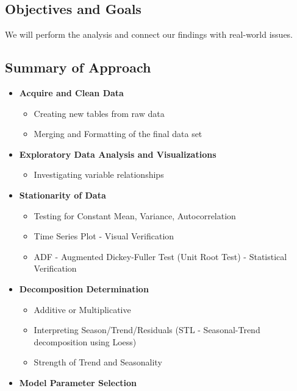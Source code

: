 \documentclass[
  letterpaper,
  DIV=11,
  numbers=noendperiod]{scrartcl}
\providecommand{\tightlist}{%
  \setlength{\itemsep}{0pt}\setlength{\parskip}{0pt}}\usepackage{longtable,booktabs,array}
\begin{document}
\subsection{Objectives and Goals}\label{objectives-and-goals}

We will perform the analysis and connect our findings with real-world
issues.

\subsection{Summary of Approach}\label{summary-of-approach}

\begin{itemize}
\tightlist
\item
  \textbf{Acquire and Clean Data}

  \begin{itemize}
  \tightlist
  \item
    Creating new tables from raw data
  \item
    Merging and Formatting of the final data set
  \end{itemize}
\item
  \textbf{Exploratory Data Analysis and Visualizations}

  \begin{itemize}
  \tightlist
  \item
    Investigating variable relationships
  \end{itemize}
\item
  \textbf{Stationarity of Data}

  \begin{itemize}
  \tightlist
  \item
    Testing for Constant Mean, Variance, Autocorrelation
  \item
    Time Series Plot - Visual Verification
  \item
    ADF - Augmented Dickey-Fuller Test (Unit Root Test) - Statistical
    Verification
  \end{itemize}
\item
  \textbf{Decomposition Determination}

  \begin{itemize}
  \tightlist
  \item
    Additive or Multiplicative
  \item
    Interpreting Season/Trend/Residuals (STL - Seasonal-Trend
    decomposition using Loess)
  \item
    Strength of Trend and Seasonality
  \end{itemize}
\item
  \textbf{Model Parameter Selection}


\end{itemize}
\end{document}
